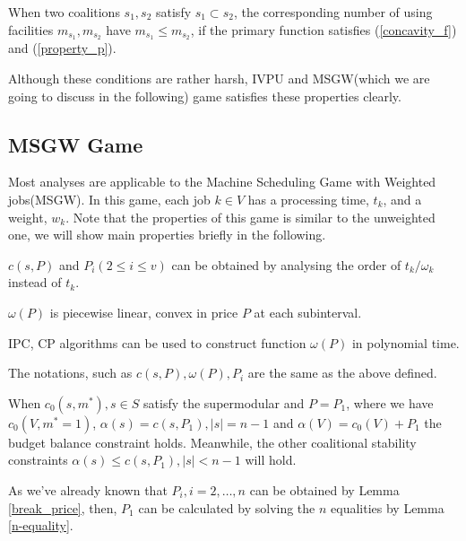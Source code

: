 \begin{thm}\label{machine_num}
When two coalitions $s_1,s_2$ satisfy $s_1 \subset s_2$, the corresponding number of using facilities $ m_{s_1}, m_{s_2}$ have $m_{s_1} \leq m_{s_2}$, if the primary function satisfies  (\ref{concavity_f}) and (\ref{property_p}).
\end{thm}

Although these conditions are rather harsh, IVPU and MSGW(which we are going to discuss in the following) game satisfies these properties clearly.

\subsection*{MSGW Game}
Most analyses are applicable to the Machine Scheduling Game with Weighted jobs(MSGW).
In this game, each job $k \in V$ has a processing time, $t_k$, and a weight, $w_k$.
Note that the properties of this game is similar to the unweighted one, we will show main properties briefly in the following.

\begin{corollary} \label{cor-1}
$c(s,P)$ and $P_i(2 \leq i \leq v)$ can be obtained by analysing the order of $t_k/\omega_k$ instead of $t_k$.

\end{corollary}

\begin{corollary} \label{cor-2}
  $\omega(P)$ is piecewise linear, convex in price $P$ at each subinterval.
\end{corollary}

\begin{corollary} \label{cor-3}
  IPC, CP algorithms can be used to construct function $\omega(P)$ in polynomial time.
\end{corollary}

The notations, such as $c(s,P), \omega(P), P_i$ are the same as the above defined.

\begin{lem}\label{n-equality}
When $c_0(s,m^*), s \in S$ satisfy the supermodular and $P=P_1$, where we have $c_0(V,m^* = 1)$, $\alpha(s)=c(s, P_1), \left| s \right|= n-1$ and $\alpha(V)=c_0(V)+P_1$ the budget balance constraint holds. Meanwhile, the other coalitional stability constraints $\alpha(s) \leq c(s, P_1), \left| s \right| < n-1$ will hold.
\end{lem}

As we've already known that $P_i, i = 2,\ldots,n$ can be obtained by Lemma \ref{break_price}, then, $P_1$ can be calculated by solving the $n$ equalities by Lemma \ref{n-equality}.

